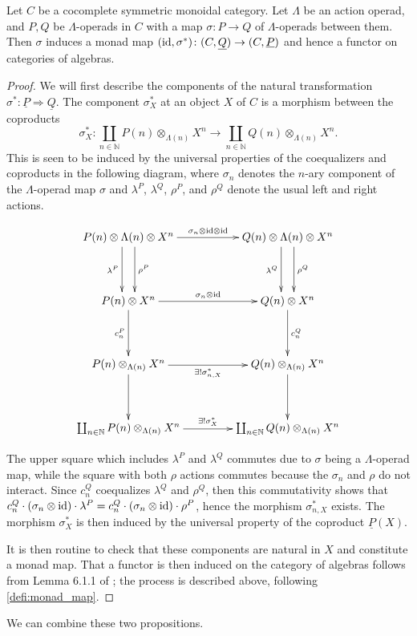 \begin{prop}\label{opmap_to_monadmap}
Let $C$ be a cocomplete symmetric monoidal category. Let $\Lambda$ be an action operad, and $P,Q$ be  $\Lambda$-operads in $C$ with a map $\sigma \colon P \rightarrow Q$ of $\Lambda$-operads between them. Then $\sigma$ induces a monad map $(\textrm{id}, \sigma^*) \colon (C,\underline{Q}) \rightarrow (C,\underline{P})$ and hence a functor on categories of algebras.
\end{prop}
\begin{proof}
We will first describe the components of the natural transformation $\sigma^* \colon \underline{P} \Rightarrow \underline{Q}$. The component $\sigma^*_X$ at an object $X$ of $C$ is a morphism between the coproducts
  \[
    \sigma^*_X \colon \coprod_{n \in \mathbb{N}} P(n) \otimes_{\Lambda(n)} X^n \rightarrow \coprod_{n \in \mathbb{N}} Q(n) \otimes_{\Lambda(n)} X^n.
  \]
This is seen to be induced by the universal properties of the coequalizers and coproducts in the following diagram, where $\sigma_n$ denotes the $n$-ary component of the $\Lambda$-operad map $\sigma$ and $\lambda^P$, $\lambda^Q$, $\rho^P$, and $\rho^Q$ denote the usual left and right actions.

  \[
    \xy
      (0,0)*+{P(n) \otimes \Lambda(n) \otimes X^n}="a";
      (50,0)*+{Q(n) \otimes \Lambda(n) \otimes X^n}="b";
      (0,-20)*+{P(n) \otimes X^n}="c";
      (50,-20)*+{Q(n) \otimes X^n}="d";
      (0,-40)*+{P(n) \otimes_{\Lambda(n)} X^n}="e";
      (50,-40)*+{Q(n) \otimes_{\Lambda(n)} X^n}="f";
      (0,-60)*+{\coprod_{n \in \mathbb{N}} P(n) \otimes_{\Lambda(n)} X^n}="g";
      (50,-60)*+{\coprod_{n \in \mathbb{N}} Q(n) \otimes_{\Lambda(n)} X^n}="h";
      {\ar^{\rho^P} (2,-3)*{}; (2,-17)*{} };
      {\ar_{\lambda^P} (-2,-3)*{}; (-2,-17)*{} };
      {\ar^{\rho^Q} (52,-3)*{}; (52,-17)*{} };
      {\ar_{\lambda^Q} (48,-3)*{}; (48,-17)*{} };
      {\ar_{c^P_n} "c" ; "e"};
      {\ar^{c^Q_n} "d" ; "f"};
      {\ar "e" ; "g"};
      {\ar "f" ; "h"};
      {\ar^{\sigma_n \otimes \id \otimes \id} "a" ; "b"};
      {\ar^{{\sigma_n} \otimes \id} "c" ; "d"};
      {\ar_{\exists! \sigma^*_{n,X}} "e" ; "f"};
      {\ar^{\exists! \sigma^*_X} "g" ; "h"};      
    \endxy
  \]

The upper square which includes $\lambda^P$ and $\lambda^Q$ commutes due to $\sigma$ being a $\Lambda$-operad map, while the square with both $\rho$ actions commutes because the $\sigma_n$ and $\rho$ do not interact. Since $c^Q_n$ coequalizes $\lambda^Q$ and $\rho^Q$, then this commutativity shows that $c^Q_n \cdot (\sigma_n \otimes \textrm{id}) \cdot \lambda^P = c^Q_n \cdot (\sigma_n \otimes \textrm{id}) \cdot \rho^P$, hence the morphism $\sigma^*_{n,X}$ exists. The morphism $\sigma^*_X$ is then induced by the universal property of the coproduct $\underline{P}(X)$.

It is then routine to check that these components are natural in $X$ and constitute a monad map. That a functor is then induced on the category of algebras follows from Lemma 6.1.1 of \cite{leinster}; the process is described above, following \cref{defi:monad_map}.
\end{proof}
We can combine these two propositions.


